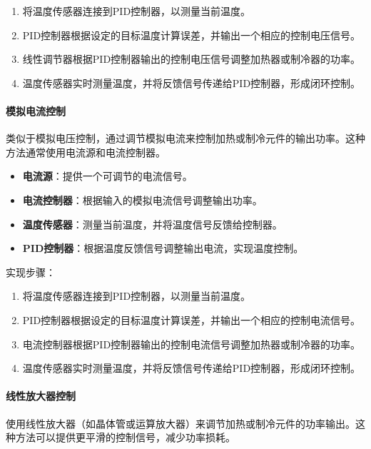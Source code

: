 \documentclass[dvipsnames, svgnames,a4paper,11pt]{article}
\begin{document}
\begin{enumerate}
    \item 将温度传感器连接到PID控制器，以测量当前温度。
    \item PID控制器根据设定的目标温度计算误差，并输出一个相应的控制电压信号。
    \item 线性调节器根据PID控制器输出的控制电压信号调整加热器或制冷器的功率。
    \item 温度传感器实时测量温度，并将反馈信号传递给PID控制器，形成闭环控制。
\end{enumerate}



\paragraph*{模拟电流控制}

类似于模拟电压控制，通过调节模拟电流来控制加热或制冷元件的输出功率。这种方法通常使用电流源和电流控制器。

\begin{itemize}
    \item \textbf{电流源}：提供一个可调节的电流信号。
    \item \textbf{电流控制器}：根据输入的模拟电流信号调整输出功率。
    \item \textbf{温度传感器}：测量当前温度，并将温度信号反馈给控制器。
    \item \textbf{PID控制器}：根据温度反馈信号调整输出电流，实现温度控制。
\end{itemize}

实现步骤：

\begin{enumerate}
    \item 将温度传感器连接到PID控制器，以测量当前温度。
    \item PID控制器根据设定的目标温度计算误差，并输出一个相应的控制电流信号。
    \item 电流控制器根据PID控制器输出的控制电流信号调整加热器或制冷器的功率。
    \item 温度传感器实时测量温度，并将反馈信号传递给PID控制器，形成闭环控制。
\end{enumerate}



\paragraph*{线性放大器控制}

使用线性放大器（如晶体管或运算放大器）来调节加热或制冷元件的功率输出。这种方法可以提供更平滑的控制信号，减少功率损耗。
\end{document}
